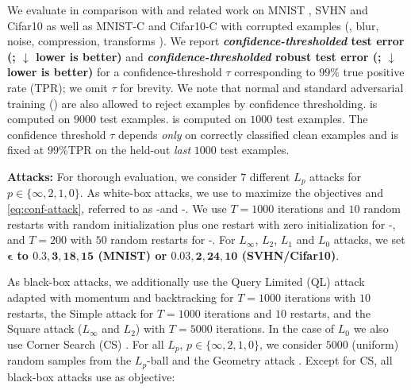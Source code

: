 We evaluate \ConfTrain in comparison with \AdvTrain \cite{MadryICLR2018} and related work \citep{MainiICML2020,ZhangICML2019} on MNIST \citep{LecunIEEE1998}, SVHN \citep{NetzerNIPS2011} and Cifar10 \citep{Krizhevsky2009} as well as MNIST-C \cite{MuICMLWORK2019} and Cifar10-C \cite{HendrycksICLR2019} with corrupted examples (\eg, blur, noise, compression, transforms \etc). We report \textbf{\textit{confidence-thresholded} test error (\TE; $\downarrow$ lower is better)} and \textbf{\textit{confidence-thresholded} robust test error (\RTE; $\downarrow$ lower is better)} for a confidence-threshold $\tau$ corresponding to $99\%$ true positive rate (TPR); we omit $\tau$ for brevity. We note that normal and standard adversarial training (\AdvTrain) are also allowed to reject examples by confidence thresholding. \TE is computed on $9000$ test examples. \RTE is computed on $1000$ test examples. The confidence threshold $\tau$ depends \emph{only} on correctly classified clean examples and is fixed at $99\%$TPR on the held-out \emph{last} $1000$ test examples.

\textbf{Attacks:}
%
For thorough evaluation, we consider $7$ different $L_p$ attacks for $p \in \{\infty, 2, 1, 0\}$. As white-box attacks, we use \PGD to maximize the objectives  and \eqref{eq:conf-attack}, referred to as \PGD-\FCE and \PGD-\FConf. We use $T = 1000$ iterations and $10$ random restarts with random initialization plus one restart with zero initialization for \PGD-\FConf, and $T = 200$ with $50$ random restarts for \PGD-\FCE. For $L_\infty$, $L_2$, $L_1$ and $L_0$ attacks, we set \textbf{$\boldsymbol{\epsilon}$ to $\boldsymbol{0.3, 3, 18, 15}$ (MNIST) or $\boldsymbol{0.03, 2, 24, 10}$ (SVHN/Cifar10)}.

As black-box attacks, we additionally use the Query Limited (QL) attack \cite{IlyasICML2018} adapted with momentum and backtracking for $T = 1000$ iterations with $10$ restarts, the Simple attack \citep{NarodytskaCVPRWORK2017} for $T = 1000$ iterations and $10$ restarts, and the Square attack ($L_\infty$ and $L_2$) \citep{AndriushchenkoARXIV2019} with $T = 5000$ iterations. In the case of $L_0$ we also use Corner Search (CS) \citep{CroceICCV2019}. For all $L_p$, $p \in \{\infty, 2, 1, 0\}$, we consider $5000$ (uniform) random samples from the $L_p$-ball and the Geometry attack \cite{KhouryARXIV2018}. Except for CS, all black-box attacks use  as objective:

